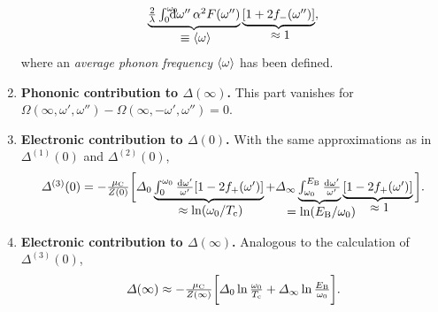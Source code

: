 \begin{enumerate}
\begin{gather*}
        \hypo
            {\frac 2 \lambda \int \from 0 \till{\omega_0} \D \omega'' \,
            \alpha^2 F(\omega'')}{\equiv \av \omega}
        \hypo{[1 + 2 f_-(\omega'')]}{\approx 1},
    \end{gather*}
    where an \emph{average phonon frequency} $\langle\omega\rangle$ has been defined.
    \item \textbf{Phononic contribution to \bm$\Delta(\infty)$.} This part
    vanishes for $\Omega(\infty, \omega', \omega'') - \Omega(\infty, -\omega',
    \omega'') = 0$.
    \item \textbf{Electronic contribution to \bm$\Delta(0)$.} With the same
    approximations as in $\Delta^{(1)}(0)$ and $\Delta^{(2)}(0)$,
    \begin{equation*}
        \Delta^{(3)}(0) = -\frac{\mu \sub C}{Z(0)} \bigg[
            \Delta_0 \hypo
                { \int_0^{\omega_0} \frac{\D \omega'}{\omega'}
                [1 - 2 f_+(\omega')] }
                {\approx \ln(\omega_0 / T \sub c)}
            + \Delta_\infty \hypo
                {\int_{\omega_0}^{E \sub B}
                \frac{\D \omega'}{\omega'}}{= \ln(E \sub B / \omega_0)}
            \hypo{[1 - 2 f_+(\omega')]}{\approx 1}
        \bigg].
    \end{equation*}
    \item \textbf{Electronic contribution to \bm$\Delta(\infty)$.} Analogous to
    the calculation of $\Delta^{(3)}(0)$,
    \begin{equation*}
        \Delta(\infty) \approx -\frac{\mu \sub C}{Z(\infty)} \bigg[
            \Delta_0 \ln \frac{\omega_0}{T \sub c}
            + \Delta_\infty \ln \frac{E \sub B}{\omega_0}
        \bigg].
    \end{equation*}
\end{enumerate}

